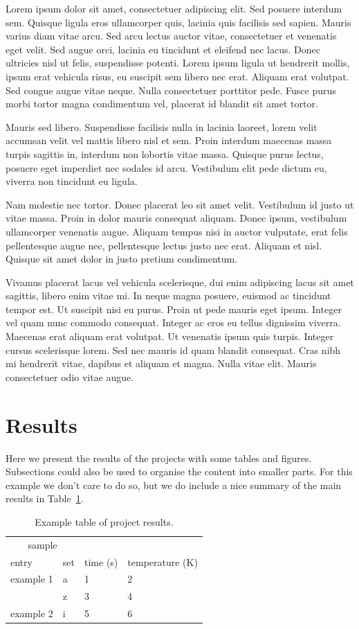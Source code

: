 \documentclass{prace}
\begin{document}
Lorem ipsum dolor sit amet, consectetuer adipiscing elit. Sed posuere interdum
sem. Quisque ligula eros ullamcorper quis, lacinia quis facilisis sed sapien.
Mauris varius diam vitae arcu. Sed arcu lectus auctor vitae, consectetuer et
venenatis eget velit. Sed augue orci, lacinia eu tincidunt et eleifend nec
lacus. Donec ultricies nisl ut felis, suspendisse potenti. Lorem ipsum ligula
ut hendrerit mollis, ipsum erat vehicula risus, eu suscipit sem libero nec
erat. Aliquam erat volutpat. Sed congue augue vitae neque. Nulla consectetuer
porttitor pede. Fusce purus morbi tortor magna condimentum vel, placerat id
blandit sit amet tortor.

Mauris sed libero. Suspendisse facilisis nulla in lacinia laoreet, lorem velit
accumsan velit vel mattis libero nisl et sem. Proin interdum maecenas massa
turpis sagittis in, interdum non lobortis vitae massa. Quisque purus lectus,
posuere eget imperdiet nec sodales id arcu. Vestibulum elit pede dictum eu,
viverra non tincidunt eu ligula.

Nam molestie nec tortor. Donec placerat leo sit amet velit. Vestibulum id
justo ut vitae massa. Proin in dolor mauris consequat aliquam. Donec ipsum,
vestibulum ullamcorper venenatis augue. Aliquam tempus nisi in auctor
vulputate, erat felis pellentesque augue nec, pellentesque lectus justo nec
erat. Aliquam et nisl. Quisque sit amet dolor in justo pretium condimentum.

Vivamus placerat lacus vel vehicula scelerisque, dui enim adipiscing lacus sit
amet sagittis, libero enim vitae mi. In neque magna posuere, euismod ac
tincidunt tempor est. Ut suscipit nisi eu purus. Proin ut pede mauris eget
ipsum. Integer vel quam nunc commodo consequat. Integer ac eros eu tellus
dignissim viverra. Maecenas erat aliquam erat volutpat. Ut venenatis ipsum
quis turpis. Integer cursus scelerisque lorem. Sed nec mauris id quam blandit
consequat. Cras nibh mi hendrerit vitae, dapibus et aliquam et magna. Nulla
vitae elit. Mauris consectetuer odio vitae augue.

\section{Results}
Here we present the results of the projects with some tables and figures.
Subsections could also be used to organise the content into smaller parts. For
this example we don't care to do so, but we do include a nice summary of the
main results in Table~\ref{tab: results}.

\begin{table}
	\caption{Example table of project results.}
	\label{tab: results}
	\begin{tabular}{llll}
		\toprule
		\multicolumn{2}{c}{sample} & {} \\
		\cmidrule(lr){1-2}
		entry & set & {} time (s) & temperature (K) \\
		\midrule
		example 1 & a & 1 & 2 \\
		{} & z & 3 & 4 \\
		example 2 & i & 5 & 6 \\
		\bottomrule
	\end{tabular}
\end{table}
\end{document}
